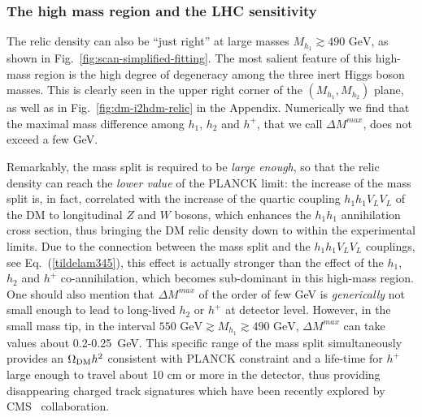 \documentclass[12pt,a4paper]{article}
\begin{document}
\subsubsection{The high mass region and the LHC sensitivity}


The relic density can also be ``just right'' at large masses $M_{h_1}\gtrsim 490\mbox{ GeV}$, as shown in Fig.~\ref{fig:scan-simplified-fitting}. 
The most salient feature of this high-mass region is the high degree of degeneracy among the three inert Higgs boson masses.
This is clearly seen in the upper right corner of the $(M_{h_1},M_{h_2})$ plane, as well as in
Fig.~\ref{fig:dm-i2hdm-relic} in the Appendix. Numerically we find that the
maximal mass difference among $h_1$, $h_2$ and $h^+$, that we call $\Delta M^{max}$, does not exceed a few GeV. 

Remarkably, the mass split is required to be {\it large enough}, so that the relic density can reach the {\it lower value} of the PLANCK limit: the increase of  the mass
split is, in fact, correlated with the increase of the quartic coupling $h_1 h_1 V_L V_L$ of the DM to longitudinal $Z$ and $W$ bosons,
which enhances the $h_1 h_1$ annihilation cross section, thus bringing
the DM relic density down to within the experimental limits. Due to the connection between the mass split and the $h_1 h_1 V_L V_L$ couplings, 
see Eq.~(\ref{tildelam345}),
this effect is actually stronger than the effect of the
$h_1$, $h_2$ and $h^+$ co-annihilation, which becomes sub-dominant in this high-mass region.
One should also mention that  $\Delta M^{max}$ of the order of few GeV  is {\it generically} not 
small enough to lead to long-lived $h_2$ or $h^+$ at detector level.
However, in the small mass tip, in the interval
$550\mbox{ GeV} \gtrsim M_{h_1}\gtrsim 490\mbox{ GeV}$,  $\Delta M^{max}$ can take values 
about 0.2-0.25~GeV. This specific range of the mass split simultaneously provides an $\Omega_{\rm DM} h^2$ consistent with 
PLANCK constraint and a life-time for $h^+$ large enough to travel about 10 cm or more in the  detector, thus
providing disappearing charged track signatures which have been recently explored  by  CMS~\cite{CMS:2014gxa}
collaboration.
\end{document}
